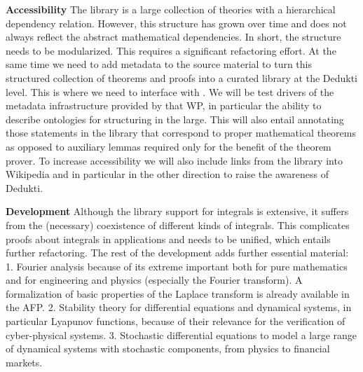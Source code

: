 \begin{workpackage}[id=libraries,wphases=0-48,type=RTD,
  short=Libraries,%
  title=Libraries,
  lead=Inr,
  InrRM=10,
  TumRM=36]
\begin{tasklist}
\begin{task}[id=isaAnalysisProb,title=The Isabelle Analysis \& Probability library]
\textbf{Accessibility}\quad
The library is a large collection of theories with a hierarchical dependency
relation. However, this structure has grown over time and does not always
reflect the abstract mathematical dependencies. In short, the structure needs
to be modularized. This requires a significant refactoring effort.
%
At the same time we need to add metadata to the source material to turn this
structured collection of theorems and proofs into a curated library at the
Dedukti level.  This is where we need to interface with . We
will be test drivers of the metadata infrastructure provided by that WP, in
particular the ability to describe ontologies for structuring in the large.
This will also entail annotating those statements in the library that
correspond to proper mathematical theorems as opposed to auxiliary lemmas
required only for the benefit of the theorem prover.
To increase accessibility we will also include links from the library into
Wikipedia and in particular in the other direction to raise the awareness
of Dedukti.

\textbf{Development}\quad
Although the library support for integrals is extensive, it suffers
from the (necessary) coexistence of different kinds of
integrals. This complicates proofs about integrals in applications and needs
to be unified, which entails further refactoring. The rest of the
development adds further essential material:
1. Fourier analysis because of its extreme important both for pure mathematics and for
engineering and physics (especially the Fourier
transform). A formalization of basic properties of the Laplace transform is already available in the AFP. 2. Stability theory for differential equations and
dynamical systems, in particular Lyapunov functions, because of their
relevance for the verification of cyber-physical systems.
3. Stochastic differential equations to model a large range of
dynamical systems with stochastic components, from physics to financial markets.
\end{task}

\begin{task}[id=geocoq,title=The GeoCoq library]
\end{task}

\begin{task}[id=flyspeck,title=The Flyspeck library]
\end{task}


\end{tasklist}
\end{workpackage}
